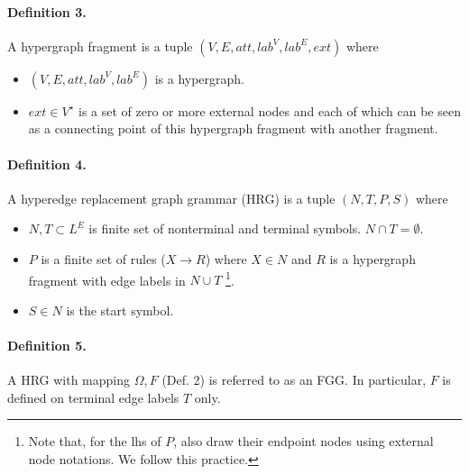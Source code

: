 \documentclass[11pt]{article}
\begin{document}
\paragraph{Definition 3.} A hypergraph fragment is a tuple $(V, E, att, lab^{V}, lab^{E}, ext)$ where
\begin{itemize}
    \item $(V, E, att, lab^{V}, lab^{E})$ is a hypergraph.
    \item $ext \in V^{\star}$ is a set of zero or more external nodes and each of which can be seen as a connecting point of this hypergraph fragment with another fragment.
\end{itemize}
\paragraph{Definition 4.} A hyperedge replacement graph grammar (HRG) \cite{DBLP:conf/gg/DrewesKH97} is a tuple $(N, T, P, S)$ where 
\begin{itemize}
    \item $N, T \subset L^E$ is finite set of nonterminal and terminal symbols. $N \cap T = \emptyset$.
    \item $P$ is a finite set of rules ($X \rightarrow R$) where 
             $X \in N$ and $R$ is a hypergraph fragment with edge labels in $N \cup T$ \footnote{Note that, for the lhs of $P$, \citet{DBLP:conf/nips/0001R20} also draw their endpoint nodes using external node notations. We follow this practice.}.
    \item $S\in N$ is the start symbol.
\end{itemize}


\paragraph{Definition 5.}
A HRG with mapping $\Omega, F$ (Def. 2) is referred to as an FGG. In particular, $F$ is defined on terminal edge labels $T$ only. 
\end{document}
